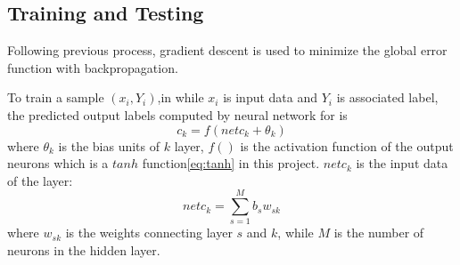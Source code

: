 \subsection{Training and Testing}

Following previous process, gradient descent is used to minimize the global error function with backpropagation. 

To train a sample $(x_{i}, Y_{i})$,in while $x_{i}$ is input data and $Y_{i}$ is associated label, the predicted output labels computed by neural network for is
\begin{equation}\label{eq:MultiLabelActivation}
c_{k} = f(netc_{k} + \theta_{k})
\end{equation}
where $\theta_{k}$ is the bias units of $k$ layer, $f()$ is the activation function of the output neurons which is a $tanh$ function\ref{eq:tanh} in this project. $netc_{k}$ is the input data of the layer:
\begin{equation}\label{eq:MultiLabel}
netc_{k} = \sum_{s=1}^M b_{s}w_{sk}
\end{equation}
where $w_{sk}$ is the weights connecting layer $s$ and $k$, while $M$ is the number of neurons in the hidden layer.

